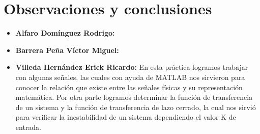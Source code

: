 \section{Observaciones y conclusiones}

\begin{itemize}
	\item \textbf{Alfaro Domínguez Rodrigo:}
	\item \textbf{Barrera Peña Víctor Miguel:} 
	\item \textbf{Villeda Hernández Erick Ricardo:}
	En esta práctica logramos trabajar con algunas señales, las cuales con ayuda de MATLAB nos sirvieron para conocer la relación que existe entre las señales físicas  y su representación matemática. Por otra parte logramos determinar la función de transferencia de un sistema y la función de transferencia de lazo cerrado, la cual nos sirvió para verificar la inestabilidad de un sistema dependiendo el valor K de entrada.
	
\end{itemize}